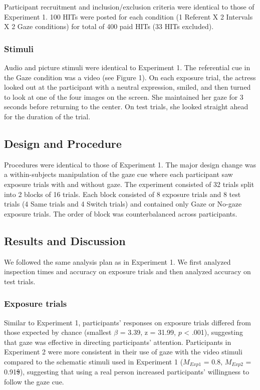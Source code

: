 \documentclass[authoryear, review]{elsarticle}
\providecommand{\DIFdeltex}[1]{{\protect\color{red}\sout{#1}}}                      %
\providecommand{\DIFdelbegin}{} %
\providecommand{\DIFdelend}{} %
\providecommand{\DIFdel}[1]{\texorpdfstring{\DIFdeltex{#1}}{}} %
\begin{document}
Participant recruitment and inclusion/exclusion criteria were identical
to those of Experiment 1. 100 HITs were posted for each condition (1
Referent X 2 Intervals X 2 Gaze conditions) for total of 400 paid HITs
(33 HITs excluded).

\subsubsection{Stimuli}\label{stimuli-1}

Audio and picture stimuli were identical to Experiment 1. The
referential cue in the Gaze condition was a video (see Figure 1). On
each exposure trial, the actress looked out at the participant with a
neutral expression, smiled, and then turned to look at one of the four
images on the screen. She maintained her gaze for 3 seconds before
returning to the center. On test trials, she looked straight ahead for
the duration of the trial.

\subsection{Design and Procedure}\label{design-and-procedure-1}

Procedures were identical to those of Experiment 1. The major design
change was a within-subjects manipulation of the gaze cue where each
participant saw exposure trials with and without gaze. The experiment
consisted of 32 trials split into 2 blocks of 16 trials. Each block
consisted of 8 exposure trials and 8 test trials (4 Same trials and 4
Switch trials) and contained only Gaze or No-gaze exposure trials. The
order of block was counterbalanced across participants.

\subsection{Results and Discussion}\label{results-and-discussion-1}

We followed the same analysis plan as in Experiment 1. We first analyzed
inspection times and accuracy on exposure trials and then analyzed
accuracy on test trials.

\subsubsection{Exposure trials}\label{exposure-trials-1}

Similar to Experiment 1, participants' responses on exposure trials
differed from those expected by chance (smallest \(\beta\) = 3.39, z =
31.99, \(p\) \textless{} .001), suggesting that gaze was effective in
directing participants' attention. Participants in Experiment 2 were
more consistent in their use of gaze with the video stimuli compared to
the schematic stimuli used in Experiment 1 (\(M_{Exp1}\) = 0.8,
\(M_{Exp2}\) = 0.91\DIFdelbegin \DIFdel{\$}\DIFdelend ), suggesting that using a real person increased
participants' willingness to follow the gaze cue.
\end{document}
